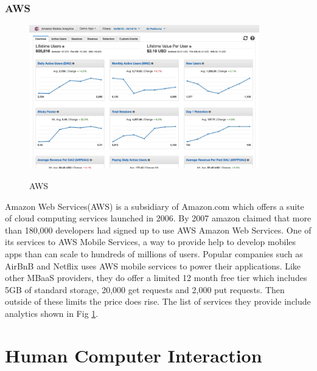 \subsubsection{AWS}

\begin{figure}[!h]
    \caption{AWS}
    \centering
    \includegraphics[width=100mm]{images/aws}
    \label{fig:aws}
\end{figure}

Amazon Web Services(AWS) \cite{aws} is a subsidiary of Amazon.com which offers a suite of cloud computing services launched in 2006.  By 2007 amazon claimed that more than 180,000 developers had signed up to use AWS Amazon Web Services. One of its services to AWS Mobile Services, a way to provide help to develop mobiles apps than can scale to hundreds of millions of users. Popular companies such as AirBnB and Netflix uses AWS mobile services to power their applications. Like other MBaaS providers, they do offer a limited 12 month free tier which includes 5GB of standard storage, 20,000 get requests and 2,000 put requests. Then outside of these limits the price does rise. The list of services they provide include analytics shown in Fig \ref{fig:aws}.





\section{Human Computer Interaction}